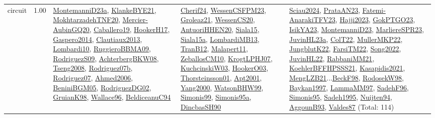 {\begin{longtable}{p{3cm}r>{\raggedright\arraybackslash}p{6cm}>{\raggedright\arraybackslash}p{6cm}>{\raggedright\arraybackslash}p{8cm}}
\index{circuit}\index{Constraints!circuit}circuit &  1.00 & \hyperref[detail:MontemanniD23a]{MontemanniD23a}, \hyperref[detail:KlankeBYE21]{KlankeBYE21}, \hyperref[detail:MokhtarzadehTNF20]{MokhtarzadehTNF20}, \hyperref[detail:Mercier-AubinGQ20]{Mercier-AubinGQ20}, \hyperref[detail:Caballero19]{Caballero19}, \hyperref[detail:HookerH17]{HookerH17}, \hyperref[detail:Gaspero2014]{Gaspero2014}, \hyperref[detail:Clautiaux2013]{Clautiaux2013}, \hyperref[detail:Lombardi10]{Lombardi10}, \hyperref[detail:RuggieroBBMA09]{RuggieroBBMA09}, \hyperref[detail:RodriguezS09]{RodriguezS09}, \hyperref[detail:AchterbergBKW08]{AchterbergBKW08}, \hyperref[detail:Tseng2008]{Tseng2008}, \hyperref[detail:Rodriguez07b]{Rodriguez07b}, \hyperref[detail:Rodriguez07]{Rodriguez07}, \hyperref[detail:Ahmed2006]{Ahmed2006}, \hyperref[detail:BeniniBGM05]{BeniniBGM05}, \hyperref[detail:RodriguezDG02]{RodriguezDG02}, \hyperref[detail:GruianK98]{GruianK98}, \hyperref[detail:Wallace96]{Wallace96}, \hyperref[detail:BeldiceanuC94]{BeldiceanuC94} & \hyperref[detail:Cherif24]{Cherif24}, \hyperref[detail:WessenCSFPM23]{WessenCSFPM23}, \hyperref[detail:Groleaz21]{Groleaz21}, \hyperref[detail:WessenCS20]{WessenCS20}, \hyperref[detail:AntuoriHHEN20]{AntuoriHHEN20}, \hyperref[detail:Siala15]{Siala15}, \hyperref[detail:Siala15a]{Siala15a}, \hyperref[detail:LombardiMB13]{LombardiMB13}, \hyperref[detail:TranB12]{TranB12}, \hyperref[detail:Malapert11]{Malapert11}, \hyperref[detail:ZeballosCM10]{ZeballosCM10}, \hyperref[detail:KrogtLPHJ07]{KrogtLPHJ07}, \hyperref[detail:KuchcinskiW03]{KuchcinskiW03}, \hyperref[detail:HookerO03]{HookerO03}, \hyperref[detail:Thorsteinsson01]{Thorsteinsson01}, \hyperref[detail:Apt2001]{Apt2001}, \hyperref[detail:Yang2000]{Yang2000}, \hyperref[detail:WatsonBHW99]{WatsonBHW99}, \hyperref[detail:Simonis99]{Simonis99}, \hyperref[detail:Simonis95a]{Simonis95a}, \hyperref[detail:DincbasSH90]{DincbasSH90} & \hyperref[detail:Sciau2024]{Sciau2024}, \hyperref[detail:PrataAN23]{PrataAN23}, \hyperref[detail:Fatemi-AnarakiTFV23]{Fatemi-AnarakiTFV23}, \hyperref[detail:Hajji2023]{Hajji2023}, \hyperref[detail:GokPTGO23]{GokPTGO23}, \hyperref[detail:IsikYA23]{IsikYA23}, \hyperref[detail:MontemanniD23]{MontemanniD23}, \hyperref[detail:MarliereSPR23]{MarliereSPR23}, \hyperref[detail:JuvinHL23a]{JuvinHL23a}, \hyperref[detail:ColT22]{ColT22}, \hyperref[detail:MullerMKP22]{MullerMKP22}, \hyperref[detail:JungblutK22]{JungblutK22}, \hyperref[detail:FarsiTM22]{FarsiTM22}, \hyperref[detail:Song2022]{Song2022}, \hyperref[detail:JuvinHL22]{JuvinHL22}, \hyperref[detail:RabbaniMM21]{RabbaniMM21}, \hyperref[detail:KoehlerBFFHPSSS21]{KoehlerBFFHPSSS21}, \hyperref[detail:Kasapidis2021]{Kasapidis2021}, \hyperref[detail:MengLZB21]{MengLZB21}...\hyperref[detail:BeckF98]{BeckF98}, \hyperref[detail:RodosekW98]{RodosekW98}, \hyperref[detail:Baykan1997]{Baykan1997}, \hyperref[detail:LammaMM97]{LammaMM97}, \hyperref[detail:SadehF96]{SadehF96}, \hyperref[detail:Simonis95]{Simonis95}, \hyperref[detail:Sadeh1995]{Sadeh1995}, \hyperref[detail:Nuijten94]{Nuijten94}, \hyperref[detail:AggounB93]{AggounB93}, \hyperref[detail:Valdes87]{Valdes87} (Total: 114)\\

\end{longtable}}
